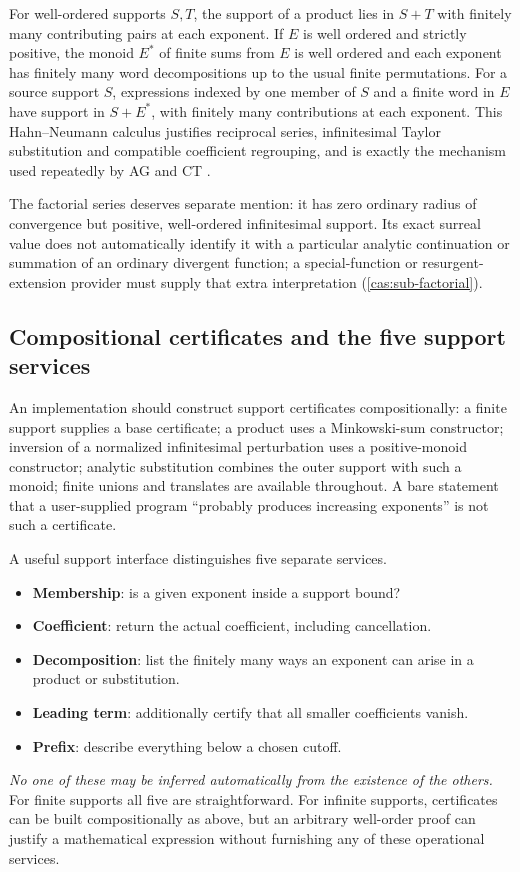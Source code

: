 \documentclass[11pt,letterpaper]{article}
\numberwithin{equation}{section}
\theoremstyle{definition}
\theoremstyle{remark}
\begin{document}
For well-ordered supports $S,T$, the support of a product lies in $S+T$ with
finitely many contributing pairs at each exponent. If $E$ is well ordered and
strictly positive, the monoid $E^*$ of finite sums from $E$ is well ordered and
each exponent has finitely many word decompositions up to the usual finite
permutations. For a source support $S$, expressions indexed by one member of $S$
and a finite word in $E$ have support in $S+E^*$, with finitely many
contributions at each exponent. This Hahn--Neumann calculus justifies reciprocal
series, infinitesimal Taylor substitution and compatible coefficient regrouping,
and is exactly the mechanism used repeatedly by AG and CT
\cite{cas:SourceAG,cas:SourceCT}.

The factorial series deserves separate mention: it has zero ordinary radius of
convergence but positive, well-ordered infinitesimal support. Its exact surreal
value does not automatically identify it with a particular analytic continuation
or summation of an ordinary divergent function; a special-function or
resurgent-extension provider must supply that extra interpretation
(\cref{cas:sub-factorial}).

\subsection{Compositional certificates and the five support services}
\label{cas:sub-services}
An implementation should construct support certificates compositionally: a
finite support supplies a base certificate; a product uses a Minkowski-sum
constructor; inversion of a normalized infinitesimal perturbation uses a
positive-monoid constructor; analytic substitution combines the outer support
with such a monoid; finite unions and translates are available throughout. A
bare statement that a user-supplied program ``probably produces increasing
exponents'' is not such a certificate.

A useful support interface distinguishes five separate services.
\begin{itemize}
\item \textbf{Membership}: is a given exponent inside a support bound?
\item \textbf{Coefficient}: return the actual coefficient, including cancellation.
\item \textbf{Decomposition}: list the finitely many ways an exponent can arise
in a product or substitution.
\item \textbf{Leading term}: additionally certify that all smaller coefficients
vanish.
\item \textbf{Prefix}: describe everything below a chosen cutoff.
\end{itemize}
\emph{No one of these may be inferred automatically from the existence of the
others.} For finite supports all five are straightforward. For infinite
supports, certificates can be built compositionally as above, but an arbitrary
well-order proof can justify a mathematical expression without furnishing any of
these operational services.
\end{document}
